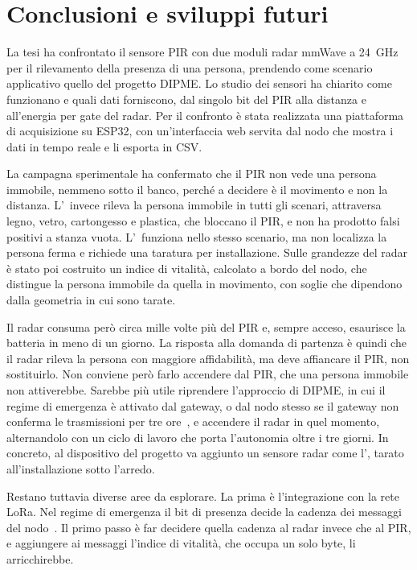 \chapter{Conclusioni e sviluppi futuri}
\label{chap:conclusioni}

La tesi ha confrontato il sensore PIR con due moduli radar mmWave a 24~GHz per il rilevamento della presenza di una persona, prendendo come scenario applicativo quello del progetto DIPME. Lo studio dei sensori ha chiarito come funzionano e quali dati forniscono, dal singolo bit del PIR alla distanza e all'energia per gate del radar. Per il confronto è stata realizzata una piattaforma di acquisizione su ESP32, con un'interfaccia web servita dal nodo che mostra i dati in tempo reale e li esporta in CSV.

La campagna sperimentale ha confermato che il PIR non vede una persona immobile, nemmeno sotto il banco, perché a decidere è il movimento e non la distanza. L'\ldb\ invece rileva la persona immobile in tutti gli scenari, attraversa legno, vetro, cartongesso e plastica, che bloccano il PIR, e non ha prodotto falsi positivi a stanza vuota. L'\ldc\ funziona nello stesso scenario, ma non localizza la persona ferma e richiede una taratura per installazione. Sulle grandezze del radar è stato poi costruito un indice di vitalità, calcolato a bordo del nodo, che distingue la persona immobile da quella in movimento, con soglie che dipendono dalla geometria in cui sono tarate.

Il radar consuma però circa mille volte più del PIR e, sempre acceso, esaurisce la batteria in meno di un giorno. La risposta alla domanda di partenza è quindi che il radar rileva la persona con maggiore affidabilità, ma deve affiancare il PIR, non sostituirlo. Non conviene però farlo accendere dal PIR, che una persona immobile non attiverebbe. Sarebbe più utile riprendere l'approccio di DIPME, in cui il regime di emergenza è attivato dal gateway, o dal nodo stesso se il gateway non conferma le trasmissioni per tre ore~\cite{callisto2026dipme}, e accendere il radar in quel momento, alternandolo con un ciclo di lavoro che porta l'autonomia oltre i tre giorni. In concreto, al dispositivo del progetto va aggiunto un sensore radar come l'\ldb, tarato all'installazione sotto l'arredo.

Restano tuttavia diverse aree da esplorare. La prima è l'integrazione con la rete LoRa. Nel regime di emergenza il bit di presenza decide la cadenza dei messaggi del nodo~\cite{callisto2026dipme}. Il primo passo è far decidere quella cadenza al radar invece che al PIR, e aggiungere ai messaggi l'indice di vitalità, che occupa un solo byte, li arricchirebbe.

